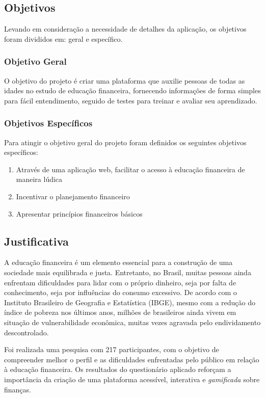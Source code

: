 \documentclass[
	article,			%
	12pt,				%
	oneside,			%
	a4paper,			%
	english,			%
	brazil,				%
	sumario=tradicional
	]{abntex2}
\begin{document}
\subsection{Objetivos}
    Levando em consideração a necessidade de detalhes da aplicação, os objetivos foram divididos em: geral e específico.
\subsubsection{Objetivo Geral}
    O objetivo do projeto é criar uma plataforma que auxilie pessoas de todas as idades no estudo de educação financeira, fornecendo informações de forma simples para fácil entendimento, seguido de testes para treinar e avaliar seu aprendizado.
\subsubsection{Objetivos Específicos}
    Para atingir o objetivo geral do projeto foram definidos os seguintes objetivos específicos:
        \begin{enumerate}[label=\alph*)]
            \item Através de uma aplicação web, facilitar o acesso à educação financeira de maneira lúdica
            \item Incentivar o planejamento financeiro
            \item Apresentar princípios financeiros básicos 
        \end{enumerate}
       
\subsection{Justificativa}    
    A educação financeira é um elemento essencial para a construção de uma sociedade mais equilibrada e justa. Entretanto, no Brasil, muitas pessoas ainda enfrentam dificuldades para lidar com o próprio dinheiro, seja por falta de conhecimento, seja por influências do consumo excessivo. De acordo com o Instituto Brasileiro de Geografia e Estatística (IBGE), mesmo com a redução do índice de pobreza nos últimos anos, milhões de brasileiros ainda vivem em situação de vulnerabilidade econômica, muitas vezes agravada pelo endividamento descontrolado.

    Foi realizada uma pesquisa com 217 participantes, com o objetivo de compreender melhor o perfil e as dificuldades enfrentadas pelo público em relação à educação financeira. Os resultados do questionário aplicado reforçam a importância da criação de uma plataforma acessível, interativa e \textit{gamificada} sobre finanças.
\end{document}
